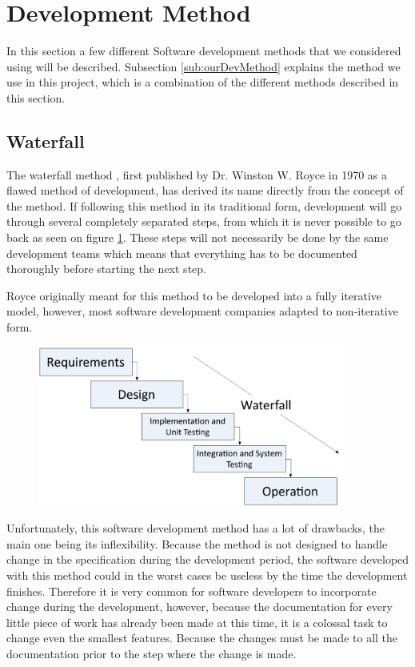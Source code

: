\section{Development Method}
\label{sec:DevelopmentMethods}
In this section a few different Software development methods that we considered using will be described. 
Subsection \ref{sub:ourDevMethod} explains the method we use in this project, which is a combination of the different methods described in this section.

\subsection{Waterfall}
The waterfall method \cite{waterfallroyce}, first published by Dr. Winston W. Royce in 1970 as a flawed method of development, has derived its name directly from the concept of the method. If following this method in its traditional form, development will go through several completely separated steps, from which it is never possible to go back as seen on figure \ref{fig:WaterfallPic}. These steps will not necessarily be done by the same development teams which means that everything has to be documented thoroughly before starting the next step.

Royce originally meant for this method to be developed into a fully iterative model, however, most software development companies adapted to non-iterative form.

\begin{figure}[H]
	\centering
		\includegraphics[width=0.90\textwidth]{input/implementation/development/waterfall.pdf}
	\label{fig:WaterfallPic}
\end{figure}

Unfortunately, this software development method has a lot of drawbacks, the main one being its inflexibility.
Because the method is not designed to handle change in the specification during the development period, the software developed with this method could in the worst cases be useless by the time the development finishes.
Therefore it is very common for software developers to incorporate change during the development, however, because the documentation for every little piece of work has already been made at this time, it is a colossal task to change even the smallest features.
Because the changes must be made to all the documentation prior to the step where the change is made. 

